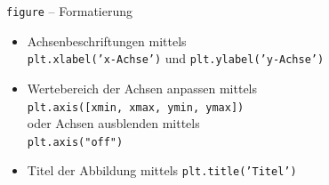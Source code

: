 \documentclass[utf8, smaller, c]{beamer}
\renewcommand{\tt}[1]{{\texttt{#1}}}
\begin{document}
\begin{frame}{\tt{figure} -- Formatierung}
	\begin{itemize}
		\item Achsenbeschriftungen mittels\\ \tt{plt.xlabel('x-Achse')} und \tt{plt.ylabel('y-Achse')}
		\item Wertebereich der Achsen anpassen mittels\\ \tt{plt.axis([xmin, xmax, ymin, ymax])} \\ oder Achsen ausblenden mittels \\ \tt{plt.axis("off")}
		\item Titel der Abbildung mittels \tt{plt.title('Titel')}
	\end{itemize}
	
	\framebreak
	

\end{frame}
\end{document}
